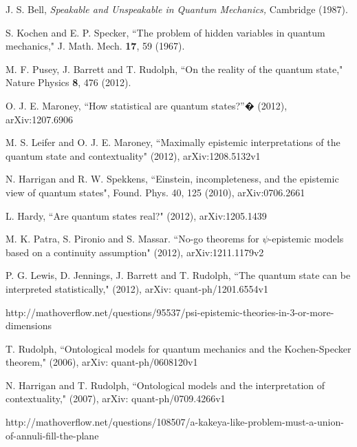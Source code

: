 \documentclass[letterpaper,11pt]{article}
\begin{document}
\begin{thebibliography}{9}
 J. S. Bell, \textit{Speakable and Unspeakable in Quantum Mechanics,} Cambridge (1987).

 S. Kochen and E. P. Specker, ``The problem of hidden variables
in quantum mechanics," J. Math. Mech. \textbf{17}, 59 (1967).

 M. F. Pusey, J. Barrett and T. Rudolph, ``On the reality of
the quantum state," Nature Physics \textbf{8}, 476 (2012).

 O. J. E. Maroney, ``How statistical are quantum states?''�
(2012), arXiv:1207.6906

 M. S. Leifer and O. J. E. Maroney, ``Maximally epistemic
interpretations of the quantum state and contextuality" (2012),
arXiv:1208.5132v1

 N. Harrigan and R. W. Spekkens, ``Einstein, incompleteness, and the epistemic view of quantum states", Found. Phys. 40, 125 (2010), arXiv:0706.2661


 L. Hardy, ``Are quantum states real?" (2012), arXiv:1205.1439

 M. K. Patra, S. Pironio and S. Massar. ``No-go theorems for $\psi$-epistemic models based on a continuity assumption" (2012), arXiv:1211.1179v2

 P. G. Lewis, D. Jennings, J. Barrett and T. Rudolph, ``The
quantum state can be interpreted statistically," (2012), arXiv:
quant-ph/1201.6554v1

http://mathoverflow.net/questions/95537/psi-epistemic-theories-in-3-or-more-dimensions

 T. Rudolph, ``Ontological models for quantum mechanics and
the Kochen-Specker theorem," (2006), arXiv: quant-ph/0608120v1

 N. Harrigan and T. Rudolph, ``Ontological models and the
interpretation of contextuality," (2007), arXiv: quant-ph/0709.4266v1

http://mathoverflow.net/questions/108507/a-kakeya-like-problem-must-a-union-of-annuli-fill-the-plane
\end{thebibliography}
\end{document}
